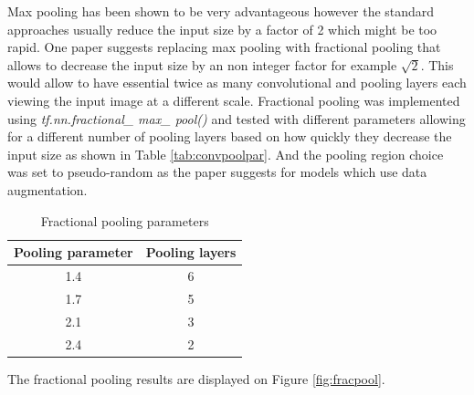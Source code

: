\documentclass[12pt]{article}
\begin{document}
Max pooling has been shown to be very advantageous however the standard approaches usually reduce the input size by a factor of 2 which might be too rapid. One paper\cite{frac} suggests replacing max pooling with fractional pooling that allows to decrease the input size by an non integer factor for example $\sqrt{2}$. This would allow to have essential twice as many convolutional and pooling layers each viewing the input image at a different scale. Fractional pooling was implemented using \textit{tf.nn.fractional\_ max\_ pool()} and tested with different parameters allowing for a different number of pooling layers based on how quickly they decrease the input size as shown in Table \ref{tab:convpoolpar}. And the pooling region choice was set to pseudo-random as the paper suggests for models which use data augmentation.


\begin{table}[H]
\centering
\begin{tabular}[h]{| c | c |}
\hline
Pooling parameter & Pooling layers  \\
\hline
1.4 & 6   \\
\hline
1.7 & 5  \\
\hline
2.1 & 3   \\
\hline 
2.4 & 2   \\
\hline 
\end{tabular} 
\caption{Fractional pooling parameters}
\label{tab:fracpool}
\end{table}

The fractional pooling results are displayed on Figure \ref{fig:fracpool}.
\end{document}
